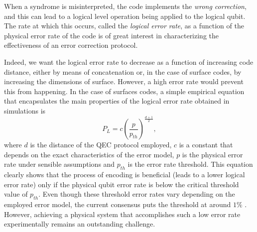 When a syndrome is misinterpreted, the code implements the \textit{wrong
  correction}, and this can lead to a logical level operation being applied to
the logical qubit. The rate at which this occurs, called the \textit{logical
  error rate}, as a function of the physical error rate of the code is of great
interest in characterizing the effectiveness of an error correction protocol.

Indeed, we want the logical error rate to decrease as a function of increasing
code distance, either by means of concatenation or, in the case of surface
codes, by increasing the dimensions of surface. However, a high error rate would
prevent this from happening. In the case of surfaces codes, a simple empirical
equation that encapsulates the main properties of the logical error rate
obtained in simulations is \cite{fowler12_surfac_codes}
\begin{equation}
  \label{eq:1}
  P_L = c\left(\frac{p}{p_{th}}\right)^{\frac{ d+1 }{2}},
\end{equation}
where $d$ is the distance of the QEC protocol employed, $c$ is a constant that
depends on the exact characteristics of the error model, $p$ is the physical
error rate under sensible assumptions and $p_{th}$ is the error rate threshold.
This equation clearly shows that the process of encoding is beneficial (leads to
a lower logical error rate) only if the physical qubit error rate is below the
critical threshold value of $p_{th}$. Even though these threshold error rates
vary depending on the employed error model, the current consensus puts the
threshold at around $1\%$ \cite{terhal15} \cite{Versluis_2017}. However,
achieving a physical system that accomplishes such a low error rate
experimentally remains an outstanding challenge.


